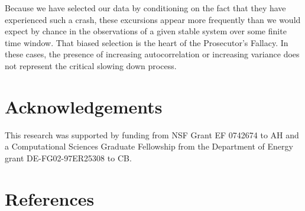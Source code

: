 \documentclass[authoryear,review,12pt]{elsarticle}
\begin{document}
Because we have selected our data by conditioning
on the fact that they have experienced such a crash, these excursions appear
more frequently than we would expect by chance in the observations of a given
stable system over some finite time window.  That biased selection is the
heart of the Prosecutor's Fallacy.  In these cases, the presence of increasing
autocorrelation or increasing variance does not represent the critical slowing
down process.



 \section{Acknowledgements}
This research was supported by funding from NSF Grant EF 0742674 to AH
and a Computational Sciences Graduate Fellowship from the Department of Energy grant DE-FG02-97ER25308 to CB. 
 \section{References}%
 
 
\end{document}

